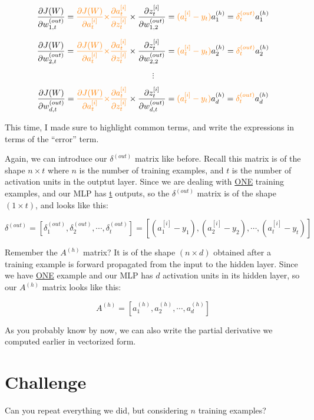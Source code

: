 \documentclass[12pt, letterpaper]{article}
\begin{document}
\vspace{5mm} %

\[
    \frac{\partial J(W)}{\partial w_{1,t}^{(out)}} = 
    \textcolor{orange}{\frac{\partial J(W)}{\partial a_{t}^{[i]}}\times}
    \textcolor{orange}{\frac{\partial a_{t}^{[i]}}{\partial z_{t}^{[i]}}}\times
    \frac{\partial z_{t}^{[i]}}{\partial w_{1,2}^{(out)}} =
    \textcolor{orange}{(a_{t}^{[i]} - y_t)}a_1^{(h)}=
    \textcolor{orange}{\delta_t^{(out)}}a_1^{(h)}
\]

\[
    \frac{\partial J(W)}{\partial w_{2,t}^{(out)}} = 
    \textcolor{orange}{\frac{\partial J(W)}{\partial a_{t}^{[i]}}\times}
    \textcolor{orange}{\frac{\partial a_{t}^{[i]}}{\partial z_{t}^{[i]}}}\times
    \frac{\partial z_{t}^{[i]}}{\partial w_{2,2}^{(out)}} =
    \textcolor{orange}{(a_{t}^{[i]} - y_t)}a_2^{(h)}=
    \textcolor{orange}{\delta_t^{(out)}}a_2^{(h)}
\]

\[\vdots\]

\[
    \frac{\partial J(W)}{\partial w_{d,t}^{(out)}} = 
    \textcolor{orange}{\frac{\partial J(W)}{\partial a_{t}^{[i]}}\times}
    \textcolor{orange}{\frac{\partial a_{t}^{[i]}}{\partial z_{t}^{[i]}}} \times
    \frac{\partial z_{t}^{[i]}}{\partial w_{d,t}^{(out)}} =
    \textcolor{orange}{(a_{t}^{[i]} - y_t)}a_d^{(h)}=
    \textcolor{orange}{\delta_t^{(out)}}a_d^{(h)}
\]

\vspace{5mm} %

This time, I made sure to highlight common terms, and write the
expressions in terms of the ``error'' term.

\vspace{5mm} %

Again, we can introduce our $\delta^{(out)}$ matrix like before.
Recall this matrix is of the shape $n \times t$ where $n$ is the
number of training examples, and $t$ is the number of activation
units in the outptut layer. Since we are dealing with \underline{ONE}
training examples, and our MLP has \underline{t} outputs, so the
$\delta^{(out)}$ matrix is of the shape $(1 \times t)$, and looks
like this:

\[
    \delta^{(out)} = [\delta_1^{(out)}, \delta_2^{(out)}, \cdots, \delta_t^{(out)}] =
    [(a_{1}^{[i]} - y_1), (a_{2}^{[i]} - y_2), \cdots, (a_{t}^{[i]} - y_t)]
\]

Remember the $A^{(h)}$ matrix? It is of the shape $(n \times d)$
obtained after a training example is forward propagated from the
input to the hidden layer. Since we have \underline{ONE} example
and our MLP has \underline{$d$} activation units in its hidden
layer, so our $A^{(h)}$ matrix looks like this:

\[
    A^{(h)} = [a_1^{(h)}, a_2^{(h)}, \cdots, a_d^{(h)}]
\]

As you probably know by now, we can also write the partial derivative
we computed earlier in vectorized form.

\section{Challenge}

Can you repeat everything we did, but considering $n$ training
examples?
\end{document}
